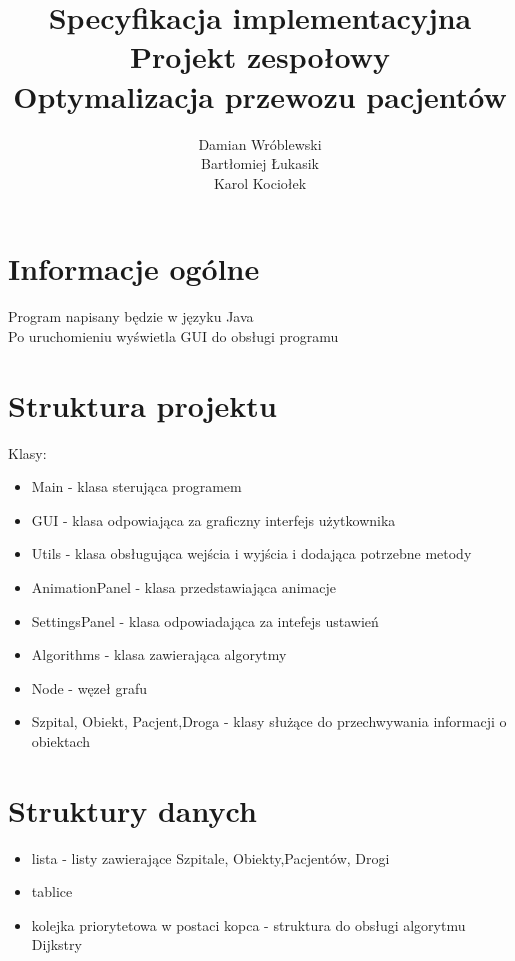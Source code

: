 \documentclass[] {article}
\title{Specyfikacja implementacyjna\\Projekt zespołowy\\Optymalizacja przewozu pacjentów}
\author{Damian Wróblewski\\Bartłomiej Łukasik\\Karol Kociołek}
\begin{document}
\maketitle

\section{Informacje ogólne}
Program napisany będzie w języku Java\\
Po uruchomieniu wyświetla GUI do obsługi programu

\section{Struktura projektu}
Klasy:
\begin{itemize}
	\item Main - klasa sterująca programem
	\item GUI - klasa odpowiająca za graficzny interfejs użytkownika
	\item Utils - klasa obsługująca wejścia i wyjścia i dodająca potrzebne metody
	\item AnimationPanel - klasa przedstawiająca animacje
	\item SettingsPanel - klasa odpowiadająca za intefejs ustawień
	\item Algorithms - klasa zawierająca algorytmy
     	\item Node - węzeł grafu
	\item Szpital, Obiekt, Pacjent,Droga - klasy służące do przechwywania informacji o obiektach
\end{itemize}

\section {Struktury danych}
\begin{itemize}
	\item lista - listy zawierające Szpitale, Obiekty,Pacjentów, Drogi
	\item tablice 
	\item kolejka priorytetowa w postaci kopca - struktura do obsługi algorytmu Dijkstry

\end{itemize}
\end{document}
